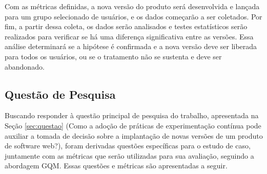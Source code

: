 Com as métricas definidas, a nova versão do produto será desenvolvida e lançada para um grupo selecionado de usuários, e os dados começarão a ser coletados. Por fim, a partir dessa coleta, os dados serão analisados e testes estatísticos serão realizados para verificar se há uma diferença significativa entre as versões. Essa análise determinará se a hipótese é confirmada e a nova versão deve ser liberada para todos os usuários, ou se o tratamento não se sustenta e deve ser abandonado.


\subsection{Questão de Pesquisa}

Buscando responder à questão principal de pesquisa do trabalho, apresentada na Seção \ref{sec:questao} (Como a adoção de práticas de experimentação contínua pode auxiliar a tomada de decisão sobre a implantação de novas versões de um produto de software web?), foram derivadas questões específicas para o estudo de caso, juntamente com as métricas que serão utilizadas para sua avaliação, seguindo a abordagem GQM. Essas questões e métricas são apresentadas a seguir.

